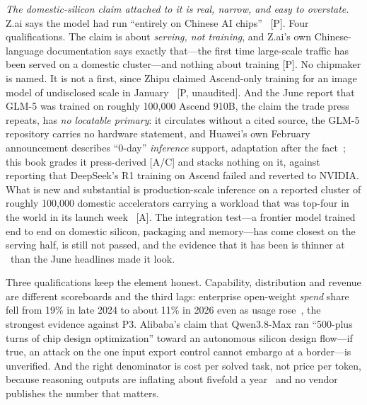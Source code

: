 \emph{The domestic-silicon claim attached to it is real, narrow, and easy to overstate.} Z.ai says the model had run ``entirely on Chinese AI chips''~\cite{glm53-chips} [P]. Four qualifications. The claim is about \emph{serving, not training}, and Z.ai's own Chinese-language documentation says exactly that---the first time large-scale traffic has been served on a domestic cluster---and nothing about training [P]. No chipmaker is named. It is not a first, since Zhipu claimed Ascend-only training for an image model of undisclosed scale in January~\cite{zhipu-ascend-prior} [P, unaudited]. And the June report that GLM-5 was trained on roughly 100,000 Ascend 910B, the claim the trade press repeats, has \emph{no locatable primary}: it circulates without a cited source, the GLM-5 repository carries no hardware statement, and Huawei's own February announcement describes ``0-day'' \emph{inference} support, adaptation after the fact~\cite{glm5-ascend-unsourced}; this book grades it press-derived [A/C] and stacks nothing on it, against reporting that DeepSeek's R1 training on Ascend failed and reverted to NVIDIA. What is new and substantial is production-scale inference on a reported cluster of roughly 100,000 domestic accelerators carrying a workload that was top-four in the world in its launch week~\cite{glm53-chips} [A]. The integration test---a frontier model trained end to end on domestic silicon, packaging and memory---has come closest on the serving half, is still not passed, and the evidence that it has been is thinner at \datafreeze\ than the June headlines made it look.

Three qualifications keep the element honest. Capability, distribution and revenue are different scoreboards and the third lags: enterprise open-weight \emph{spend} share fell from 19\% in late 2024 to about 11\% in 2026 even as usage rose~\cite{menlo}, the strongest evidence against P3. Alibaba's claim that Qwen3.8-Max ran ``500-plus turns of chip design optimization'' toward an autonomous silicon design flow---if true, an attack on the one input export control cannot embargo at a border---is unverified. And the right denominator is cost per solved task, not price per token, because reasoning outputs are inflating about fivefold a year~\cite{epoch-output} and no vendor publishes the number that matters.

